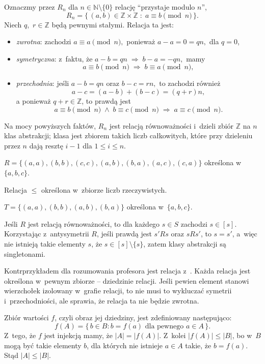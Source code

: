 \exercise %
Oznaczmy przez $R_n$ dla $n\in\mathbb{N}\setminus\{0\}$ relację ``przystaje modulo $n$'',
\[
	R_n = \bigl\{\,(a,b)\in\mathbb{Z}\times\mathbb{Z}\;:\;a\equiv b\!\!\!\pmod{n}\,\bigr\}.
\]
Niech $q$,~$r\in\mathbb{Z}$ będą pewnymi stałymi. Relacja ta jest:
\begin{itemize}
	\item \emph{zwrotna}: zachodzi $a\equiv a\pmod{n},$ ponieważ $a-a=0=qn,$ dla $q=0$,
	\item \emph{symetryczna}: z~faktu, że $a-b=qn\;\Rightarrow\;b-a=-qn,$ mamy
	\[
		a\equiv b\!\!\!\pmod{n}\;\Rightarrow\;b\equiv a\!\!\!\pmod{n},
	\]
	\item \emph{przechodnia}: jeśli $a-b=qn$ oraz $b-c=rn,$ to zachodzi również
	\[
		a-c=(a-b)+(b-c)=(q+r)n,
	\]
	a ponieważ $q+r\in\mathbb{Z}$, to prawdą jest
	\[
		a\equiv b\!\!\!\pmod{n}\;\wedge\;b\equiv c\!\!\!\pmod{n}\;\Rightarrow\;a\equiv c\!\!\!\pmod{n}.
	\]
\end{itemize}

Na mocy powyższych faktów, $R_n$ jest relacją równoważności i~dzieli zbiór $\mathbb{Z}$ na $n$ klas abstrakcji;  klasa jest zbiorem takich liczb całkowitych, które przy dzieleniu przez $n$ dają resztę $i-1$ dla $1\le i\le n$.

\exercise %
\subexercise
$R=\bigl\{(a,a),(b,b),(c,c),(a,b),(b,a),(a,c),(c,a)\bigr\}$ określona w~$\{a,b,c\}$.

\subexercise
Relacja $\le$ określona w~zbiorze liczb rzeczywistych.

\subexercise
$T=\bigl\{(a,a),(b,b),(a,b),(b,a)\bigr\}$ określona w~$\{a,b,c\}$.

\exercise %
Jeśli $R$ jest relacją równoważności, to dla każdego $s\in S$ zachodzi $s\in[s]$. Korzystając z~antysymetrii $R$, jeśli prawdą jest $s'\!Rs$ oraz $sRs'$, to $s=s'$, a~więc nie istnieją takie elementy $s$, że $s\in[s]\setminus\{s\}$, zatem klasy abstrakcji są singletonami.

\exercise %
Kontrprzykładem dla rozumowania profesora jest relacja z~. Każda relacja jest określona w~pewnym zbiorze -- dziedzinie relacji. Jeśli pewien element stanowi wierzchołek izolowany w~grafie relacji, to nie musi to wykluczać symetrii i~przechodniości, ale sprawia, że relacja ta nie będzie zwrotna.


\exercise %
\subexercise
Zbiór wartości $f$, czyli obraz jej dziedziny, jest zdefiniowany następująco:
\[
	f(A) = \bigl\{\,b\in B:b=f(a)\text{ dla pewnego $a\in A$}\,\bigr\}.
\]
Z~tego, że $f$ jest injekcją mamy, że $|A|=|f(A)|$. Z~kolei $|f(A)|\le|B|$, bo w~$B$ mogą być takie elementy $b$, dla których nie istnieje $a\in A$ takie, że $b=f(a)$. Stąd $|A|\le|B|$.

